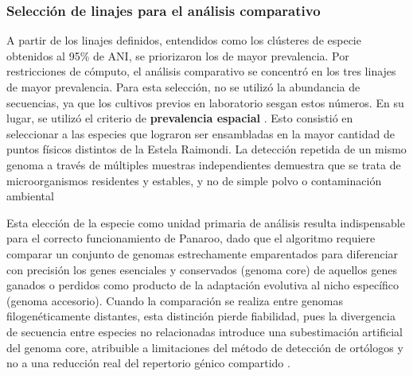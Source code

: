 \subsubsection{Selección de linajes para el análisis comparativo}

A partir de los linajes definidos, entendidos como los clústeres de especie obtenidos al 95\% de ANI, se priorizaron los de mayor prevalencia. Por restricciones de cómputo, el análisis comparativo se concentró en los tres linajes de mayor prevalencia. Para esta selección,  no se utilizó la abundancia de secuencias, ya que los cultivos previos en laboratorio sesgan estos números. En su lugar, se utilizó el criterio de \textbf{prevalencia espacial} \cite{olm2017}. Esto consistió en seleccionar a las especies que lograron ser ensambladas en la mayor cantidad de puntos físicos distintos de la Estela Raimondi. La detección repetida de un mismo genoma a través de múltiples muestras independientes demuestra que se trata de microorganismos residentes y estables, y no de simple polvo o contaminación ambiental

Esta elección de la especie como unidad primaria de análisis resulta indispensable para el correcto funcionamiento de Panaroo, dado que el algoritmo requiere comparar un conjunto de genomas estrechamente emparentados para diferenciar con precisión los genes esenciales y conservados (genoma core) de aquellos genes ganados o perdidos como producto de la adaptación evolutiva al nicho específico (genoma accesorio). Cuando la comparación se realiza entre genomas filogenéticamente distantes, esta distinción pierde fiabilidad, pues la divergencia de secuencia entre especies no relacionadas introduce una subestimación artificial del genoma core, atribuible a limitaciones del método de detección de ortólogos y no a una reducción real del repertorio génico compartido \cite{panaroo2020}.



